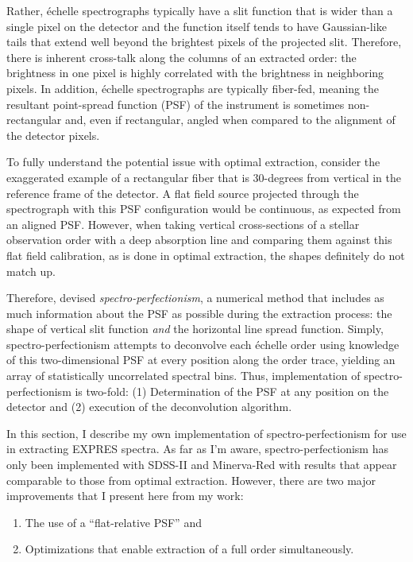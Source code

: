 Rather, \'{e}chelle spectrographs typically have a slit function that is wider than a single pixel on the detector and the function itself tends to have Gaussian-like tails that extend well beyond the brightest pixels of the projected slit. Therefore, there is inherent cross-talk along the columns of an extracted order: the brightness in one pixel is highly correlated with the brightness in neighboring pixels. In addition, \'{e}chelle spectrographs are typically fiber-fed, meaning the resultant point-spread function (PSF) of the instrument is sometimes non-rectangular and, even if rectangular, angled when compared to the alignment of the detector pixels.

To fully understand the potential issue with optimal extraction, consider the exaggerated example of a rectangular fiber that is 30-degrees from vertical in the reference frame of the detector. A flat field source projected through the spectrograph with this PSF configuration would be continuous, as expected from an aligned PSF. However, when taking vertical cross-sections of a stellar observation order with a deep absorption line and comparing them against this flat field calibration, as is done in optimal extraction, the shapes definitely do not match up.

Therefore, \citet{bolton_spectro-perfectionism_2009} devised \textit{spectro-perfectionism}, a numerical me\-thod that includes as much information about the PSF as possible during the extraction process: the shape of vertical slit function \textit{and} the horizontal line spread function. Simply, spectro-perfectionism attempts to deconvolve each \'{e}chelle order using knowledge of this two-dimensional PSF at every position along the order trace, yielding an array of statistically uncorrelated spectral bins. Thus, implementation of spectro-perfectionism is two-fold: (1) Determination of the PSF at any position on the detector and (2) execution of the deconvolution algorithm.

In this section, I describe my own implementation of spectro-perfectionism for use in extracting EXPRES spectra. As far as I'm aware, spectro-perfectionism has only been implemented with SDSS-II \citep{bolton_spectro-perfectionism_2009} and Minerva-Red \citep{cornachione_full_2019} with results that appear comparable to those from optimal extraction. However, there are two major improvements that I present here from my work:
\begin{enumerate}
    \item The use of a ``flat-relative PSF'' and
    \item Optimizations that enable extraction of a full order simultaneously.
\end{enumerate}

